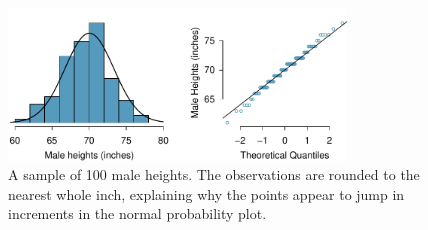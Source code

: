 \begin{figure}
\centering
\includegraphics[width=0.8\textwidth]{ch_distributions/figures/fcidMHeights/fcidMHeights}
\caption{A sample of 100 male heights. The observations are rounded to the nearest whole inch, explaining why the points appear to jump in increments in the normal probability plot.}
\label{fcidMHeights}
\end{figure}

\textC{\newpage}

